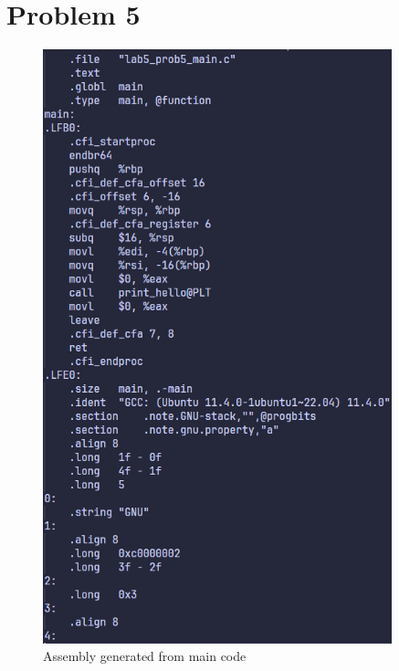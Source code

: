 \documentclass{article}
\begin{document}
\section*{Problem 5}
\begin{minipage}{0.5\textwidth}
    \begin{figure}[H]
        \centering
        \includegraphics[width=0.9\textwidth]{../images/prob5_code1.png}
        \caption{Assembly generated from main code}
    \end{figure}
\end{minipage}
\end{document}
